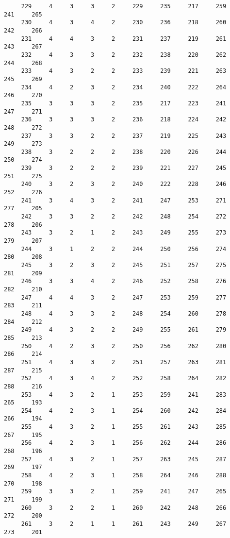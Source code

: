 \begin{verbatim}
     229     4     3     3     2     229     235     217     259     241     265
     230     4     3     4     2     230     236     218     260     242     266
     231     4     4     3     2     231     237     219     261     243     267
     232     4     3     3     2     232     238     220     262     244     268
     233     4     3     2     2     233     239     221     263     245     269
     234     4     2     3     2     234     240     222     264     246     270
     235     3     3     3     2     235     217     223     241     247     271
     236     3     3     3     2     236     218     224     242     248     272
     237     3     3     2     2     237     219     225     243     249     273
     238     3     2     2     2     238     220     226     244     250     274
     239     3     2     2     2     239     221     227     245     251     275
     240     3     2     3     2     240     222     228     246     252     276
     241     3     4     3     2     241     247     253     271     277     205
     242     3     3     2     2     242     248     254     272     278     206
     243     3     2     1     2     243     249     255     273     279     207
     244     3     1     2     2     244     250     256     274     280     208
     245     3     2     3     2     245     251     257     275     281     209
     246     3     3     4     2     246     252     258     276     282     210
     247     4     4     3     2     247     253     259     277     283     211
     248     4     3     3     2     248     254     260     278     284     212
     249     4     3     2     2     249     255     261     279     285     213
     250     4     2     3     2     250     256     262     280     286     214
     251     4     3     3     2     251     257     263     281     287     215
     252     4     3     4     2     252     258     264     282     288     216
     253     4     3     2     1     253     259     241     283     265     193
     254     4     2     3     1     254     260     242     284     266     194
     255     4     3     2     1     255     261     243     285     267     195
     256     4     2     3     1     256     262     244     286     268     196
     257     4     3     2     1     257     263     245     287     269     197
     258     4     2     3     1     258     264     246     288     270     198
     259     3     3     2     1     259     241     247     265     271     199
     260     3     2     2     1     260     242     248     266     272     200
     261     3     2     1     1     261     243     249     267     273     201

\end{verbatim}
